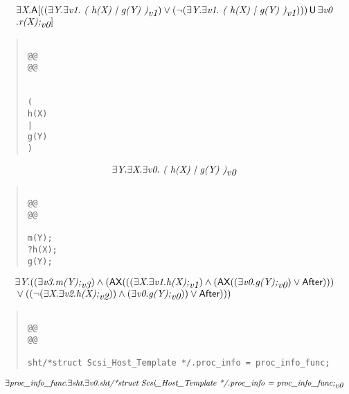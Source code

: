 \documentclass{article}
\newcommand{\U}{\,\mbox{\sf{U}}\,}
\newcommand{\A}{\mbox{\sf{A}}}
\newcommand{\AX}{\mbox{\sf{AX}}}
\newcommand{\mita}[1]{\mbox{\it{{#1}}}}
\newcommand{\msf}[1]{\mbox{\sf{{#1}}}}
\begin{document}
\[\begin{array}{l}
\exists \mita{X} . \A[((\exists \mita{Y} . \exists \mita{v1} . \mita{
(
h(X)
|
g(Y)
)}_{\mita{v1}}) \vee (\neg (\exists \mita{Y} . \exists \mita{v1} . \mita{
(
h(X)
|
g(Y)
)}_{\mita{v1}}))) \U \exists \mita{v0}\\\mbox{} . \mita{r(X);}_{\mita{v0}}]

\end{array}\]

\begin{quote}\begin{verbatim}

@@
@@


(
h(X)
|
g(Y)
)
\end{verbatim}\end{quote}

\[\begin{array}{l}
\exists \mita{Y} . \exists \mita{X} . \exists \mita{v0} . \mita{
(
h(X)
|
g(Y)
)}_{\mita{v0}}
\end{array}\]

\begin{quote}\begin{verbatim}

@@
@@

m(Y);
?h(X);
g(Y);
\end{verbatim}\end{quote}

\[\begin{array}{l}
\exists \mita{Y} . ((\exists \mita{v3} . \mita{m(Y);}_{\mita{v3}}) \wedge (\AX(((\exists \mita{X} . \exists \mita{v1} . \mita{h(X);}_{\mita{v1}}) \wedge (\AX((\exists \mita{v0} . \mita{g(Y);}_{\mita{v0}}) \vee \msf{After})))\\\mbox{} \vee ((\neg (\exists \mita{X} . \exists \mita{v2} . \mita{h(X);}_{\mita{v2}})) \wedge (\exists \mita{v0} . \mita{g(Y);}_{\mita{v0}})) \vee \msf{After})))
\end{array}\]

\begin{quote}\begin{verbatim}

@@
@@

sht/*struct Scsi_Host_Template */.proc_info = proc_info_func;
\end{verbatim}\end{quote}

\[\begin{array}{l}
\exists \mita{proc\_info\_func} . \exists \mita{sht} . \exists \mita{v0} . \mita{sht/*struct Scsi\_Host\_Template */.proc\_info = proc\_info\_func;}_{\mita{v0}}
\end{array}\]
\end{document}
